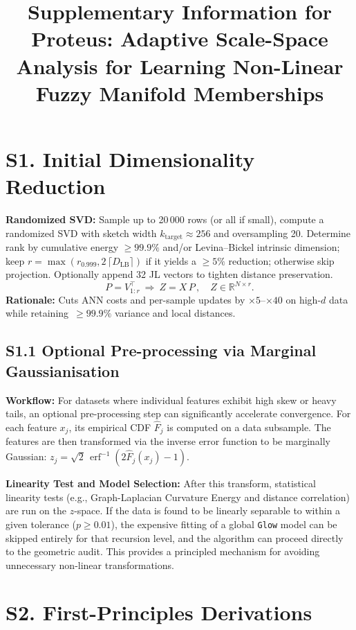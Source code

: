 \documentclass[11pt]{article}
\title{Supplementary Information for\\ Proteus: Adaptive Scale-Space Analysis for Learning Non-Linear Fuzzy Manifold Memberships}
\author{}
\date{}
\begin{document}
\maketitle

\section*{S1. Initial Dimensionality Reduction}
\textbf{Randomized SVD:} Sample up to 20\,000 rows (or all if small), compute a randomized SVD with sketch width $k_{\mathrm{target}}\approx 256$ and oversampling 20. Determine rank by cumulative energy $\ge 99.9\%$ and/or Levina--Bickel intrinsic dimension; keep $r=\max(r_{0.999},2\,\lceil D_{\mathrm{LB}}\rceil)$ if it yields a $\ge 5\%$ reduction; otherwise skip projection. Optionally append 32 JL vectors to tighten distance preservation.
\[P=V_{1:r}^{\top}\ \Rightarrow\ Z = X\,P\,,\quad Z\in\mathbb R^{N\times r}.\]
\textbf{Rationale:} Cuts ANN costs and per-sample updates by $\times 5$--$\times 40$ on high-$d$ data while retaining \,$\ge 99.9\%$ variance and local distances.

\subsection*{S1.1 Optional Pre-processing via Marginal Gaussianisation}
\textbf{Workflow:} For datasets where individual features exhibit high skew or heavy tails, an optional pre-processing step can significantly accelerate convergence. For each feature $x_j$, its empirical CDF $\hat F_j$ is computed on a data subsample. The features are then transformed via the inverse error function to be marginally Gaussian: $z_j = \sqrt{2}\,\operatorname{erf}^{-1}\!(2\hat F_j(x_j)-1)$.

\textbf{Linearity Test and Model Selection:} After this transform, statistical linearity tests (e.g., Graph-Laplacian Curvature Energy and distance correlation) are run on the $z$-space. If the data is found to be linearly separable to within a given tolerance ($p \ge 0.01$), the expensive fitting of a global \texttt{Glow} model can be skipped entirely for that recursion level, and the algorithm can proceed directly to the geometric audit. This provides a principled mechanism for avoiding unnecessary non-linear transformations.

\section*{S2. First-Principles Derivations}
\end{document}
